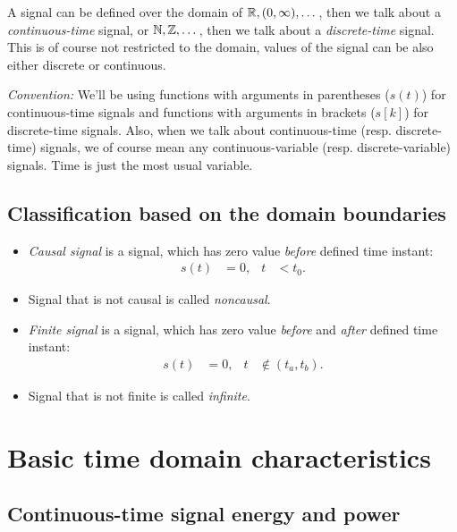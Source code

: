 \documentclass[11pt,a4paper]{report}
\theoremstyle{remark}
\theoremstyle{definition}
\begin{document}
				A signal can be defined over the domain of ${\mathbb R}, (0, \infty), \dots$, then we talk about a \textit{continuous-time} signal, or ${\mathbb N}, {\mathbb Z}, \dots$, then we talk about a \textit{discrete-time} signal. This is of course not restricted to the domain, values of the signal can be also either discrete or continuous.
				
				\textit{Convention:} We'll be using functions with arguments in parentheses ($s(t)$) for continuous-time signals and functions with arguments in brackets ($s[k]$) for discrete-time signals. Also, when we talk about continuous-time (resp. discrete-time) signals, we of course mean any continuous-variable (resp. discrete-variable) signals. Time is just the most usual variable.
			
			\subsection{Classification based on the domain boundaries}
				
				\begin{itemize}
					\item \textit{Causal signal} is a signal, which has zero value \textit{before} defined time instant:
						\begin{align}
							s(t) &= 0,
						&
							t &< t_0.
						\end{align}
						
					\item Signal that is not causal is called \textit{noncausal}.
					
					\item \textit{Finite signal} is a signal, which has zero value \textit{before} and \textit{after} defined time instant:
						\begin{align}
							s(t) &= 0,
						&
							t &\not\in (t_a, t_b).
						\end{align}
					
					\item Signal that is not finite is called \textit{infinite}.
				\end{itemize}
				
			
		\section{Basic time domain characteristics}
			
			\subsection{Continuous-time signal energy and power}
				
\end{document}
